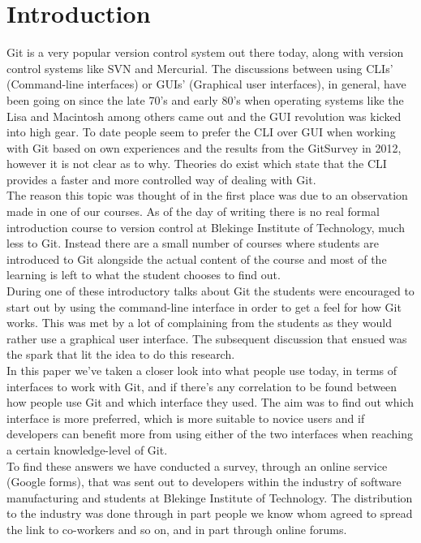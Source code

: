 \documentclass[a4paper,oneside]{bth} %
\begin{document}
		\chapter{Introduction}
		Git is a very popular version control system out there today, along with version control systems like SVN and Mercurial. The discussions between using CLIs' (Command-line interfaces) or GUIs' (Graphical user interfaces), in general, have been going on since the late 70's and early 80's when operating systems like the Lisa and Macintosh among others came out \cite{HistoryOfGUIWiki} and the GUI revolution was kicked into high gear.
		To date people seem to prefer the CLI over GUI when working with Git based on own experiences and the results from the GitSurvey in 2012\cite{GitUserSurvey}, however it is not clear as to why.
		Theories do exist which state that the CLI provides a faster and more controlled way of dealing with Git. \cite{GitUserSurvey}\cite{GitInClassroom}
		\\
		The reason this topic was thought of in the first place was due to an observation made in one of our courses. As of the day of writing there is no real formal introduction course to version control at Blekinge Institute of Technology, much less to Git. Instead there are a small number of courses where students are introduced to Git alongside the actual content of the course and most of the learning is left to what the student chooses to find out.\\
		During one of these introductory talks about Git the students were encouraged to start out by using the command-line interface in order to get a feel for how Git works. This was met by a lot of complaining from the students as they would rather use a graphical user interface. The subsequent discussion that ensued was the spark that lit the idea to do this research.
		\\
		In this paper we've taken a closer look into what people use today, in terms of interfaces to work with Git, and if there's any correlation to be found between how people use Git and which interface they used.
		The aim was to find out which interface is more preferred, which is more suitable to novice users and if developers can benefit more from using either of the two interfaces when reaching a certain knowledge-level of Git.\\
		To find these answers we have conducted a survey, through an online service (Google forms), that was sent out to developers within the industry of software manufacturing and students at Blekinge Institute of Technology. The distribution to the industry was done through in part people we know whom agreed to spread the link to co-workers and so on, and in part through online forums. \\
\end{document}
